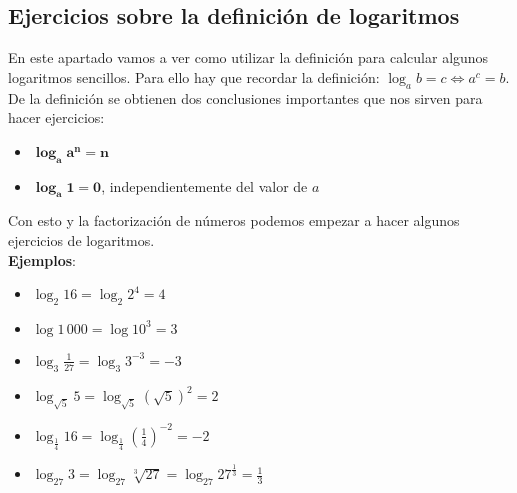 \documentclass[a4paper,10pt,answers]{exam}
\begin{document}
\subsection{Ejercicios sobre la definición de logaritmos}
En este apartado vamos a ver como utilizar la definición para calcular algunos logaritmos sencillos. Para ello hay que recordar la definición: $\log_a b = c \Leftrightarrow a^c = b$.\\
De la definición se obtienen dos conclusiones importantes que nos sirven para hacer ejercicios:
\begin{itemize}
	\item $\boldsymbol{\log_a a^n = n}$
	\item $\boldsymbol{\log_a 1 = 0}$, independientemente del valor de $a$
\end{itemize}

Con esto y la factorización de números podemos empezar a hacer algunos ejercicios de logaritmos.\\
\textbf{Ejemplos}:
\begin{itemize}
	\item $\log_2 16 = \log_2 2^4 = 4$
	\item $\log 1\,000 = \log 10^3 = 3$
	\item $\log_3 \frac{1}{27} = \log_3 3^{-3} = -3$
	\item $\log_{\sqrt{5}} 5 = \log_{\sqrt{5}} (\sqrt{5})^2 = 2$
	\item $\log_\frac{1}{4} 16 = \log_\frac{1}{4} \left(\frac{1}{4} \right)^{-2} = -2$
	\item $\log_{27} 3 = \log_{27} \sqrt[3]{27} = \log_{27} 27^\frac{1}{3} = \frac{1}{3}$
\end{itemize}
\end{document}
